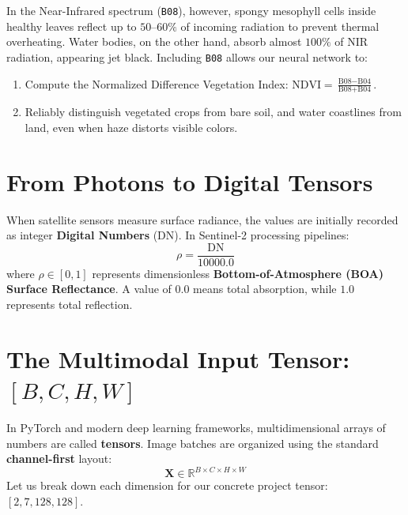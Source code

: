 In the Near-Infrared spectrum (\texttt{B08}), however, spongy mesophyll cells inside healthy leaves reflect up to $50\text{--}60\%$ of incoming radiation to prevent thermal overheating. Water bodies, on the other hand, absorb almost $100\%$ of NIR radiation, appearing jet black. Including \texttt{B08} allows our neural network to:
\begin{enumerate}
    \item Compute the Normalized Difference Vegetation Index: $\text{NDVI} = \frac{\text{B08} - \text{B04}}{\text{B08} + \text{B04}}$.
    \item Reliably distinguish vegetated crops from bare soil, and water coastlines from land, even when haze distorts visible colors.
\end{enumerate}

\section{From Photons to Digital Tensors}
When satellite sensors measure surface radiance, the values are initially recorded as integer \textbf{Digital Numbers} (DN). In Sentinel-2 processing pipelines:
\begin{equation}
\rho = \frac{\text{DN}}{10000.0}
\end{equation}
where $\rho \in [0, 1]$ represents dimensionless \textbf{Bottom-of-Atmosphere (BOA) Surface Reflectance}. A value of $0.0$ means total absorption, while $1.0$ represents total reflection.

\section{The Multimodal Input Tensor: \texorpdfstring{$[B, C, H, W]$}{[B, C, H, W]}}
In PyTorch and modern deep learning frameworks, multidimensional arrays of numbers are called \textbf{tensors}. Image batches are organized using the standard \textbf{channel-first} layout:
\begin{equation}
\mathbf{X} \in \mathbb{R}^{B \times C \times H \times W}
\end{equation}
Let us break down each dimension for our concrete project tensor: $[2, 7, 128, 128]$.



